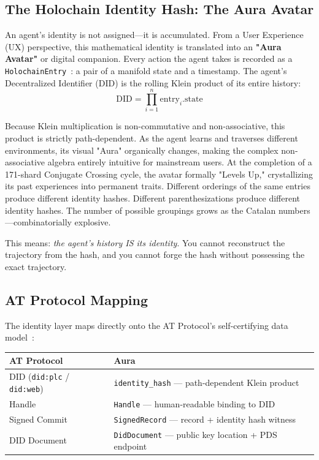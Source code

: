 \documentclass[12pt,a4paper]{article}
\begin{document}
\subsection{The Holochain Identity Hash: The Aura Avatar}

An agent's identity is not assigned---it is accumulated. From a User Experience (UX) perspective, this mathematical identity is translated into an \textbf{"Aura Avatar"} or digital companion. Every action the agent takes is recorded as a \texttt{HolochainEntry}~\cite{brock2018holochain}: a pair of a manifold state and a timestamp. The agent's Decentralized Identifier (DID) is the rolling Klein product of its entire history:
\begin{equation}
\mathrm{DID} = \prod_{i=1}^{n} \mathrm{entry}_i.\mathrm{state}
\end{equation}

Because Klein multiplication is non-commutative and non-associative, this product is strictly path-dependent. As the agent learns and traverses different environments, its visual "Aura" organically changes, making the complex non-associative algebra entirely intuitive for mainstream users. At the completion of a 171-shard Conjugate Crossing cycle, the avatar formally "Levels Up," crystallizing its past experiences into permanent traits. Different orderings of the same entries produce different identity hashes. Different parenthesizations produce different identity hashes. The number of possible groupings grows as the Catalan numbers---combinatorially explosive.

This means: \emph{the agent's history IS its identity}. You cannot reconstruct the trajectory from the hash, and you cannot forge the hash without possessing the exact trajectory.

\subsection{AT Protocol Mapping}

The identity layer maps directly onto the AT Protocol's self-certifying data model~\cite{atproto2024}:

\begin{center}
\small
\begin{tabular}{@{}ll@{}}
\toprule
\textbf{AT Protocol} & \textbf{Aura} \\
\midrule
DID (\texttt{did:plc} / \texttt{did:web}) & \texttt{identity\_hash} --- path-dependent Klein product \\
Handle & \texttt{Handle} --- human-readable binding to DID \\
Signed Commit & \texttt{SignedRecord} --- record + identity hash witness \\
DID Document & \texttt{DidDocument} --- public key location + PDS endpoint \\
\bottomrule
\end{tabular}
\end{center}
\end{document}
